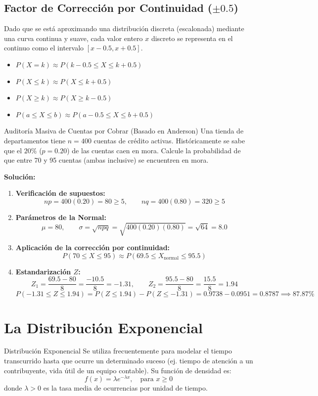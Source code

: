 \subsection{Factor de Corrección por Continuidad ($\pm 0.5$)}
Dado que se está aproximando una distribución discreta (escalonada) mediante una curva continua y suave, cada valor entero $x$ discreto se representa en el continuo como el intervalo $[x - 0.5, x + 0.5]$.
\begin{itemize}
    \item $P(X = k) \approx P(k - 0.5 \le X \le k + 0.5)$
    \item $P(X \le k) \approx P(X \le k + 0.5)$
    \item $P(X \ge k) \approx P(X \ge k - 0.5)$
    \item $P(a \le X \le b) \approx P(a - 0.5 \le X \le b + 0.5)$
\end{itemize}

\begin{ejemplo}{Auditoría Masiva de Cuentas por Cobrar (Basado en Anderson)}
Una tienda de departamentos tiene $n = 400$ cuentas de crédito activas. Históricamente se sabe que el $20\%$ ($p = 0.20$) de las cuentas caen en mora. Calcule la probabilidad de que entre 70 y 95 cuentas (ambas inclusive) se encuentren en mora.

\tcbline
\textbf{Solución:}
\begin{enumerate}
    \item \textbf{Verificación de supuestos:}
    \[
    np = 400(0.20) = 80 \ge 5, \qquad nq = 400(0.80) = 320 \ge 5
    \]
    \item \textbf{Parámetros de la Normal:}
    \[
    \mu = 80, \qquad \sigma = \sqrt{npq} = \sqrt{400(0.20)(0.80)} = \sqrt{64} = 8.0
    \]
    \item \textbf{Aplicación de la corrección por continuidad:}
    \[
    P(70 \le X \le 95) \approx P(69.5 \le X_{\text{normal}} \le 95.5)
    \]
    \item \textbf{Estandarización $Z$:}
    \[
    Z_1 = \frac{69.5 - 80}{8} = \frac{-10.5}{8} = -1.31, \qquad Z_2 = \frac{95.5 - 80}{8} = \frac{15.5}{8} = 1.94
    \]
    \[
    P(-1.31 \le Z \le 1.94) = P(Z \le 1.94) - P(Z \le -1.31) = 0.9738 - 0.0951 = 0.8787 \implies 87.87\%
    \]
\end{enumerate}
\end{ejemplo}

\section{La Distribución Exponencial}
\begin{definicion}{Distribución Exponencial}
Se utiliza frecuentemente para modelar el tiempo transcurrido hasta que ocurre un determinado suceso (ej. tiempo de atención a un contribuyente, vida útil de un equipo contable). Su función de densidad es:
\begin{equation}
    f(x) = \lambda e^{-\lambda x}, \quad \text{para } x \ge 0
\end{equation}
donde $\lambda > 0$ es la tasa media de ocurrencias por unidad de tiempo.
\end{definicion}

